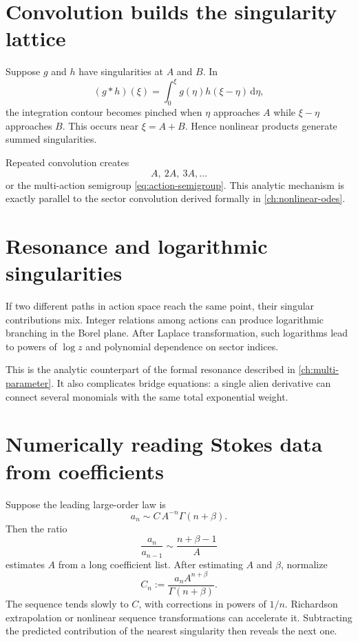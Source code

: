\documentclass[11pt,openany]{book}
\theoremstyle{definition}
\theoremstyle{plain}
\theoremstyle{remark}
\newcommand{\dd}{\,\mathrm{d}}
\begin{document}
\section{Convolution builds the singularity lattice}

Suppose $g$ and $h$ have singularities at $A$ and $B$. In
\[
 (g*h)(\xi)=\int_0^\xi g(\eta)h(\xi-\eta)\dd\eta,
\]
the integration contour becomes pinched when $\eta$ approaches $A$ while $\xi-\eta$ approaches $B$. This occurs near $\xi=A+B$. Hence nonlinear products generate summed singularities.

Repeated convolution creates
\[
 A,\ 2A,\ 3A,\dots
\]
or the multi-action semigroup \eqref{eq:action-semigroup}. This analytic mechanism is exactly parallel to the sector convolution derived formally in \cref{ch:nonlinear-odes}.

\section{Resonance and logarithmic singularities}

If two different paths in action space reach the same point, their singular contributions mix. Integer relations among actions can produce logarithmic branching in the Borel plane. After Laplace transformation, such logarithms lead to powers of $\log z$ and polynomial dependence on sector indices.

This is the analytic counterpart of the formal resonance described in \cref{ch:multi-parameter}. It also complicates bridge equations: a single alien derivative can connect several monomials with the same total exponential weight.

\section{Numerically reading Stokes data from coefficients}

Suppose the leading large-order law is
\[
 a_n\sim C\,A^{-n}\Gamma(n+\beta).
\]
Then the ratio
\begin{equation}\label{eq:large-order-ratio}
 \frac{a_n}{a_{n-1}}
 \sim\frac{n+\beta-1}{A}
\end{equation}
estimates $A$ from a long coefficient list. After estimating $A$ and $\beta$, normalize
\begin{equation}\label{eq:stokes-sequence}
 C_n:=\frac{a_nA^{n+\beta}}{\Gamma(n+\beta)}.
\end{equation}
The sequence tends slowly to $C$, with corrections in powers of $1/n$. Richardson extrapolation or nonlinear sequence transformations can accelerate it. Subtracting the predicted contribution of the nearest singularity then reveals the next one.
\end{document}
